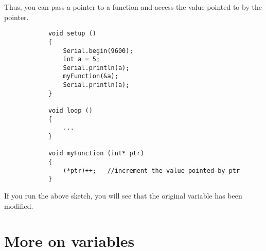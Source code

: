 \documentclass{article}
\begin{document}
			Thus, you can pass a pointer to a function and access the value pointed to by the pointer.

			\begin{lstlisting}
			void setup ()
			{
				Serial.begin(9600);
				int a = 5;
				Serial.println(a);
				myFunction(&a);
				Serial.println(a);
			}

			void loop ()
			{
				...
			}

			void myFunction (int* ptr)
			{
				(*ptr)++;	//increment the value pointed by ptr
			}
			\end{lstlisting}

			If you run the above sketch, you will see that the original variable  has been modified.

\section{More on variables}
\end{document}

